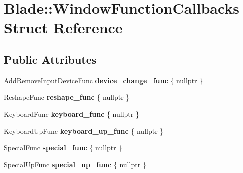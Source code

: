 \hypertarget{struct_blade_1_1_window_function_callbacks}{}\section{Blade\+:\+:Window\+Function\+Callbacks Struct Reference}
\label{struct_blade_1_1_window_function_callbacks}
\subsection*{Public Attributes}
\begin{DoxyCompactItemize}
\item 
\mbox{\label{struct_blade_1_1_window_function_callbacks_ac1da22413d79a807ba1debf54a5ff4ea}} 
Add\+Remove\+Input\+Device\+Func {\bfseries device\+\_\+change\+\_\+func} \{ nullptr \}
\item 
\mbox{\label{struct_blade_1_1_window_function_callbacks_a4bdaa6db7470412efe293a0a007e2c03}} 
Reshape\+Func {\bfseries reshape\+\_\+func} \{ nullptr \}
\item 
\mbox{\label{struct_blade_1_1_window_function_callbacks_ab923f11086a860f8e8e9cbe2d18c9758}} 
Keyboard\+Func {\bfseries keyboard\+\_\+func} \{ nullptr \}
\item 
\mbox{\label{struct_blade_1_1_window_function_callbacks_a2fc9cc83625c5480f2bb67b0497ed363}} 
Keyboard\+Up\+Func {\bfseries keyboard\+\_\+up\+\_\+func} \{ nullptr \}
\item 
\mbox{\label{struct_blade_1_1_window_function_callbacks_a0173f2a0dd34a6cf89888703bb73708a}} 
Special\+Func {\bfseries special\+\_\+func} \{ nullptr \}
\item 
\mbox{\label{struct_blade_1_1_window_function_callbacks_ad9cd050ea1afd21dd23d6bedf35dca91}} 
Special\+Up\+Func {\bfseries special\+\_\+up\+\_\+func} \{ nullptr \}
\item 
\mbox{\label{struct_blade_1_1_window_function_callbacks_ad2b825d9507b478ea0400cb34aad8395}} 

\end{DoxyCompactItemize}

